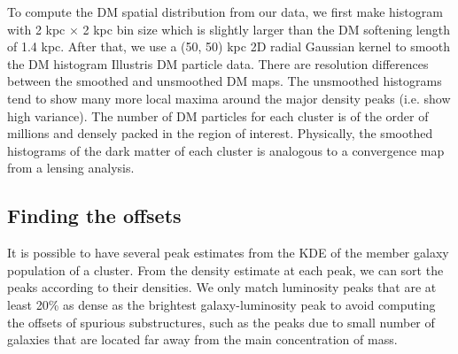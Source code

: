 To compute the DM spatial distribution from our data, we first make histogram with 2 kpc
$\times$ 2 kpc bin size which is slightly larger than the DM softening length of 1.4 kpc. 
After that, we use a (50, 50) kpc 2D radial Gaussian kernel 
to smooth the DM histogram Illustris DM
particle data. 
There are resolution differences between the smoothed and unsmoothed DM
maps. The unsmoothed histograms tend to show many more local maxima around the major
density peaks (i.e. show high variance). 
The number of DM particles for each cluster is of 
the order of millions and densely packed in the region of
interest. 
Physically, the smoothed histograms of the dark matter of each cluster 
is analogous to a convergence map from a lensing analysis. 


\subsection{Finding the offsets} \label{subsec:offsets}
It is possible to have several peak estimates from the KDE of the member galaxy 
population of a cluster. 
From the density estimate at each peak, we can sort 
the peaks according to their densities. We only match luminosity 
peaks that are at 
least 20\% as dense as the brightest galaxy-luminosity peak to avoid 
computing the offsets of spurious substructures, such as the peaks due to 
small number of galaxies that are located far away from the main concentration of mass.

